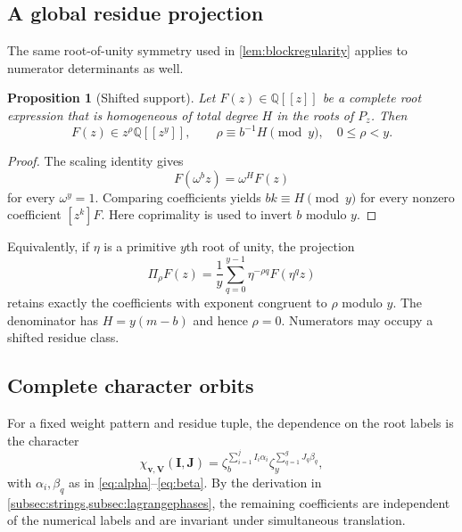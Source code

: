 \documentclass[11pt]{amsart}
\newtheorem{proposition}[theorem]{Proposition}
\theoremstyle{remark}
\newcommand{\Q}{\mathbb{Q}}
\begin{document}
\subsection{A global residue projection}

The same root-of-unity symmetry used in \cref{lem:blockregularity} applies to numerator determinants as well.

\begin{proposition}[Shifted support]\label{prop:shiftedsupport}
Let $F(z)\in\Q[[z]]$ be a complete root expression that is homogeneous of total degree $H$ in the roots of $P_z$.  Then
\begin{equation}\label{eq:shiftedclass}
    F(z)\in z^\rho\Q[[z^y]],
    \qquad
    \rho\equiv b^{-1}H\pmod y,
    \quad 0\leq\rho<y.
\end{equation}
\end{proposition}

\begin{proof}
The scaling identity gives
\[
    F(\omega^b z)=\omega^H F(z)
\]
for every $\omega^y=1$.  Comparing coefficients yields $bk\equiv H\pmod y$ for every nonzero coefficient $[z^k]F$.  Here coprimality is used to invert $b$ modulo $y$.
\end{proof}

Equivalently, if $\eta$ is a primitive $y$th root of unity, the projection
\begin{equation}\label{eq:projection}
    \Pi_\rho F(z)
    =\frac1y\sum_{q=0}^{y-1}\eta^{-\rho q}F(\eta^qz)
\end{equation}
retains exactly the coefficients with exponent congruent to $\rho$ modulo $y$.  The denominator has $H=y(m-b)$ and hence $\rho=0$.  Numerators may occupy a shifted residue class.

\subsection{Complete character orbits}\label{subsec:orbits}

For a fixed weight pattern and residue tuple, the dependence on the root labels is the character
\begin{equation}\label{eq:character}
 \chi_{\mathbf v,\mathbf V}(\mathbf I,\mathbf J)
 =\zeta_b^{\sum_{i=1}^{j}I_i\alpha_i}
  \zeta_y^{\sum_{q=1}^{g}J_q\beta_q},
\end{equation}
with $\alpha_i,\beta_q$ as in \eqref{eq:alpha}--\eqref{eq:beta}.  By the derivation in \cref{subsec:strings,subsec:lagrangephases}, the remaining coefficients are independent of the numerical labels and are invariant under simultaneous translation.
\end{document}
